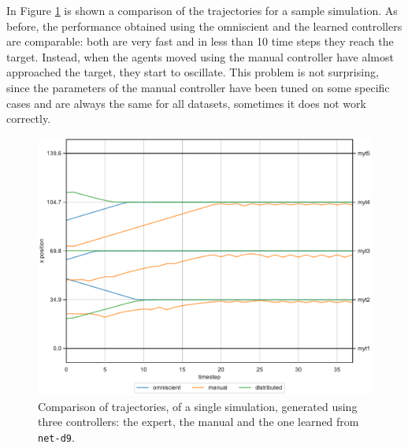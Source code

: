In Figure \ref{fig:net-d9traj1} is shown a comparison of the trajectories for a 
sample simulation.
As before, the performance obtained using the omniscient and the learned 
controllers are comparable: both are very fast and in less than 10 time steps they 
reach the target. 
Instead, when the agents moved using the manual controller have almost 
approached the target, they start to oscillate. This problem is not surprising, since 
the parameters of the manual controller have been tuned on some specific cases 
and are always the same for all datasets, sometimes it does not work correctly.
\begin{figure}[!htb]
	\centering
	\includegraphics[width=.65\textwidth]{contents/images/net-d9/animation-distributed}%
	\caption[Evaluation of the trajectories obtained with \texttt{all\_sensor} 
	input.]{Comparison of trajectories, of a single simulation, generated using three 
		controllers: the expert, the manual and the one learned from \texttt{net-d9}.}
	\label{fig:net-d9traj1}
\end{figure}  


